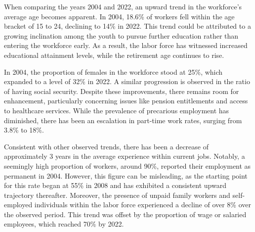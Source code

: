 \begin{onehalfspace}

When comparing the years 2004 and 2022, an upward trend in the workforce's
average age becomes apparent. In 2004, 18.6\% of workers fell within
the age bracket of 15 to 24, declining to 14\% in 2022. This trend
could be attributed to a growing inclination among the youth to pursue
further education rather than entering the workforce early. As a result,
the labor force has witnessed increased educational attainment levels,
while the retirement age continues to rise.

In 2004, the proportion of females in the workforce stood at 25\%,
which expanded to a level of 32\% in 2022. A similar progression is
observed in the ratio of having social security. Despite these improvements,
there remains room for enhancement, particularly concerning issues
like pension entitlements and access to healthcare services. While
the prevalence of precarious employment has diminished, there has
been an escalation in part-time work rates, surging from 3.8\% to
18\%.

Consistent with other observed trends, there has been a decrease of
approximately 3 years in the average experience within current jobs.
Notably, a seemingly high proportion of workers, around 90\%, reported
their employment as permanent in 2004. However, this figure can be
misleading, as the starting point for this rate began at 55\% in 2008
and has exhibited a consistent upward trajectory thereafter. Moreover,
the presence of unpaid family workers and self-employed individuals
within the labor force experienced a decline of over 8\% over the
observed period. This trend was offset by the proportion of wage or
salaried employees, which reached 70\% by 2022.
\end{onehalfspace}
\begin{center}

\par\end{center}

